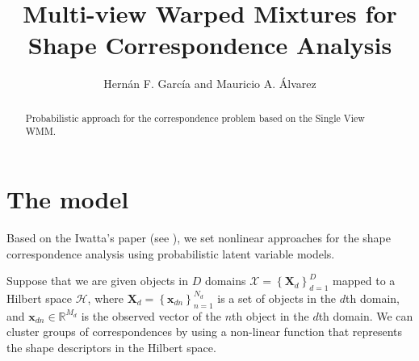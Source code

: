 \documentclass[]{article}
\title{Multi-view Warped Mixtures for Shape Correspondence Analysis}
\author{Hern\'an F. Garc\'ia and Mauricio A. \'Alvarez}
\newcommand{\setObj}{\mathbf{X}_d}
\newcommand{\indobj}{\mathbf{x}_{dn}}
\begin{document}
\maketitle

\begin{abstract}
Probabilistic approach for the correspondence problem based on the Single View WMM\cite{IwaDuvGha2012warped}.
\end{abstract}

\section{The model}

Based on the Iwatta's paper (see \cite{Iwata13,Iwata16}), we set nonlinear approaches for the shape correspondence analysis using probabilistic latent variable models.

Suppose that we are given objects in $D$ domains $\mathcal{X}=\left\{\setObj\right\}_{d=1}^D$ mapped to a Hilbert space $\mathcal{H}$, where $\setObj = \left\{\indobj\right\}_{n=1}^{N_d}$ is a set of objects in the $d$th domain, and $\indobj \in \mathbb{R}^{M_d}$ is  the observed vector of the $n$th object in the $d$th domain. We can cluster groups of correspondences by using a non-linear function that represents the shape descriptors in the Hilbert space.
\end{document}
